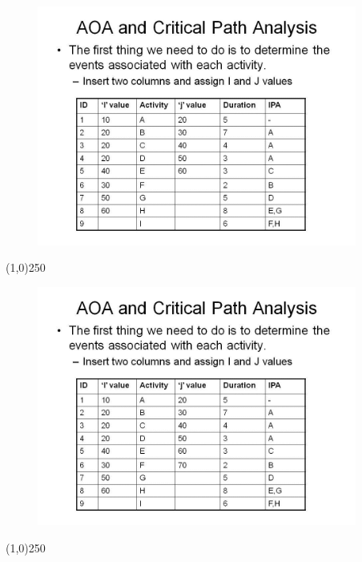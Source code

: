 \begin{frame}
\begin{figure}
	\centering
		\includegraphics[width = 10.5cm]{oldnotes/Slide72.jpg}
\end{figure}
\end{frame}
\begin{center}\line(1,0){250}\end{center}


\begin{frame}
\begin{figure}
	\centering
		\includegraphics[width = 10.5cm]{oldnotes/Slide73.jpg}
\end{figure}
\end{frame}
\begin{center}\line(1,0){250}\end{center}


